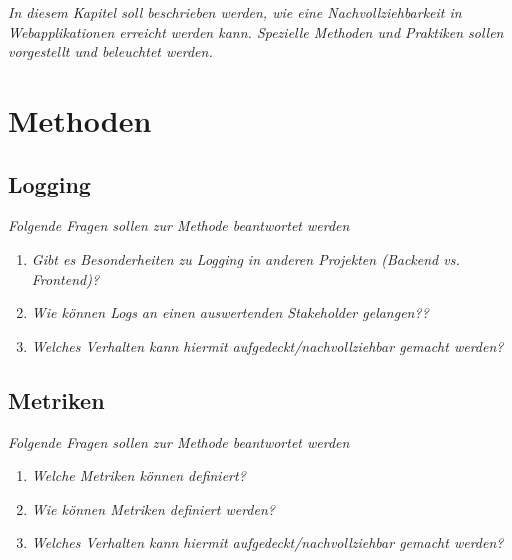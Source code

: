 
\textit{In diesem Kapitel soll beschrieben werden, wie eine Nachvollziehbarkeit in Webapplikationen erreicht werden kann. Spezielle Methoden und Praktiken sollen vorgestellt und beleuchtet werden.}

\section{Methoden}

\subsection{Logging}

\textit{Folgende Fragen sollen zur Methode beantwortet werden}
\begin{enumerate}
	\item \textit{Gibt es Besonderheiten zu Logging in anderen Projekten (Backend vs. Frontend)?}
	\item \textit{Wie können Logs an einen auswertenden Stakeholder gelangen??}
	\item \textit{Welches Verhalten kann hiermit aufgedeckt/nachvollziehbar gemacht werden?}
\end{enumerate}

%

\subsection{Metriken}

\textit{Folgende Fragen sollen zur Methode beantwortet werden}
\begin{enumerate}
	\item \textit{Welche Metriken können definiert?}
	\item \textit{Wie können Metriken definiert werden?}
	\item \textit{Welches Verhalten kann hiermit aufgedeckt/nachvollziehbar gemacht werden?}
\end{enumerate}


